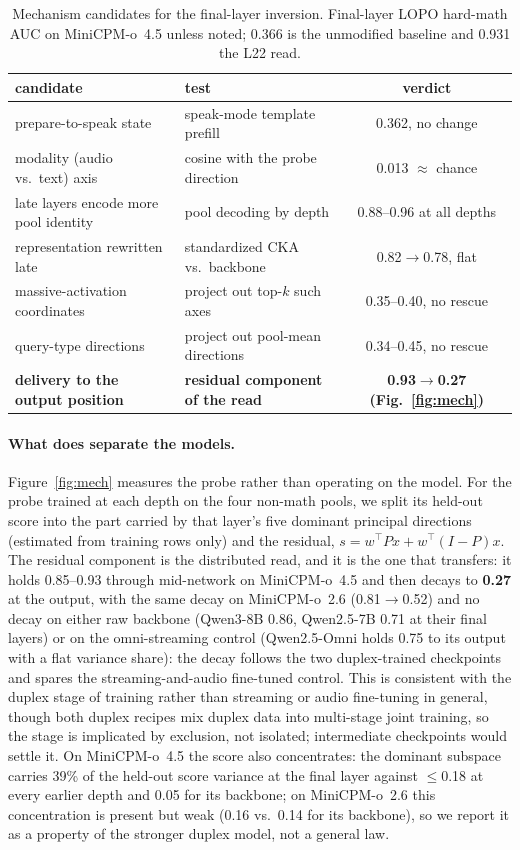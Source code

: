 \begin{table}[h]
\centering\footnotesize
\caption{Mechanism candidates for the final-layer inversion. Final-layer
LOPO hard-math AUC on MiniCPM-o~4.5 unless noted; 0.366 is the
unmodified baseline and 0.931 the L22 read.}
\label{tab:mech}
\begin{tabular}{llc}
\toprule
candidate & test & verdict \\
\midrule
prepare-to-speak state & speak-mode template prefill & 0.362, no change \\
modality (audio vs.\ text) axis & cosine with the probe direction & 0.013 $\approx$ chance \\
late layers encode more pool identity & pool decoding by depth & 0.88--0.96 at all depths \\
representation rewritten late & standardized CKA vs.\ backbone & 0.82$\to$0.78, flat \\
massive-activation coordinates & project out top-$k$ such axes & 0.35--0.40, no rescue \\
query-type directions & project out pool-mean directions & 0.34--0.45, no rescue \\
\midrule
\textbf{delivery to the output position} & \textbf{residual component of the read} & \textbf{0.93$\to$0.27 (Fig.~\ref{fig:mech})} \\
\bottomrule
\end{tabular}
\end{table}

\paragraph{What does separate the models.} Figure~\ref{fig:mech}
measures the probe rather than operating on the model. For the probe
trained at each depth on the four non-math pools, we split its
held-out score into the part carried by that layer's five dominant
principal directions (estimated from training rows only) and the
residual, $s = w^\top P x + w^\top (I-P) x$. The residual component is
the distributed read, and it is the one that transfers: it holds
0.85--0.93 through mid-network on MiniCPM-o~4.5 and then decays to
\textbf{0.27} at the output, with the same decay on MiniCPM-o~2.6
(0.81$\to$0.52) and no decay on either raw backbone (Qwen3-8B
0.86, Qwen2.5-7B 0.71 at their final layers) or on the omni-streaming
control (Qwen2.5-Omni holds 0.75 to its output with a flat variance
share): the decay follows the two duplex-trained checkpoints and
spares the streaming-and-audio fine-tuned control. This is consistent
with the duplex stage of training rather than streaming or audio
fine-tuning in general, though both duplex recipes mix duplex data
into multi-stage joint training, so the stage is implicated by
exclusion, not isolated; intermediate checkpoints would settle it. On MiniCPM-o~4.5 the
score also concentrates: the dominant subspace carries 39\% of the
held-out score variance at the final layer against $\le$0.18 at every
earlier depth and 0.05 for its backbone; on MiniCPM-o~2.6 this
concentration is present but weak (0.16 vs.\ 0.14 for its backbone),
so we report it as a property of the stronger duplex model, not a
general law.

